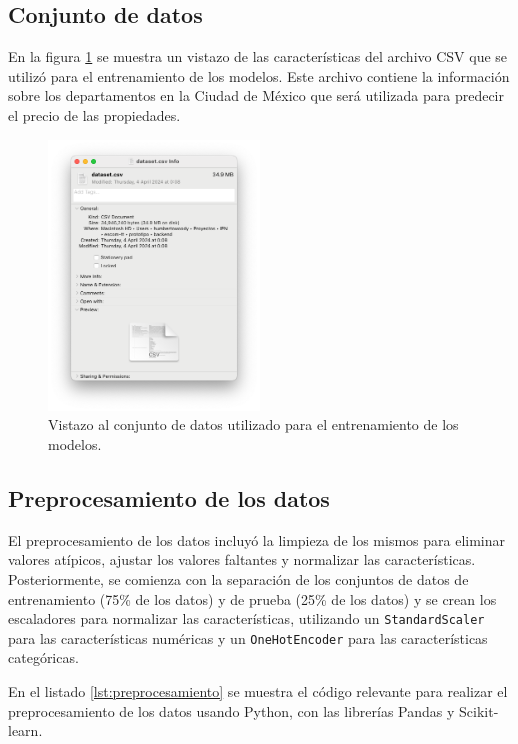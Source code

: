 \subsection{Conjunto de datos}
En la figura \ref{fig:conjunto-datos-finder} se muestra un vistazo de las características
del archivo CSV que se utilizó para el entrenamiento de los modelos. Este archivo
contiene la información sobre los departamentos en la Ciudad de México que será
utilizada para predecir el precio de las propiedades.

\begin{figure}[H]
    \centering
    \includegraphics[width=0.5\textwidth]{imagenes/05-implementacion/desarrollo-modelos/conjunto-datos-finder.png}
    \caption{Vistazo al conjunto de datos utilizado para el entrenamiento de los modelos.}
    \label{fig:conjunto-datos-finder}
\end{figure}

\subsection{Preprocesamiento de los datos}
El preprocesamiento de los datos incluyó la limpieza de los mismos para eliminar
valores atípicos, ajustar los valores faltantes y normalizar las características.
Posteriormente, se comienza con la separación de los conjuntos de datos
de entrenamiento (75\% de los datos) y de prueba (25\% de los datos) y se crean
los escaladores para normalizar las características, utilizando un \texttt{StandardScaler}
para las características numéricas y un \texttt{OneHotEncoder} para las características categóricas.

En el listado \ref{lst:preprocesamiento} se muestra el código relevante para realizar
el preprocesamiento de los datos usando Python, con las librerías Pandas y Scikit-learn.


